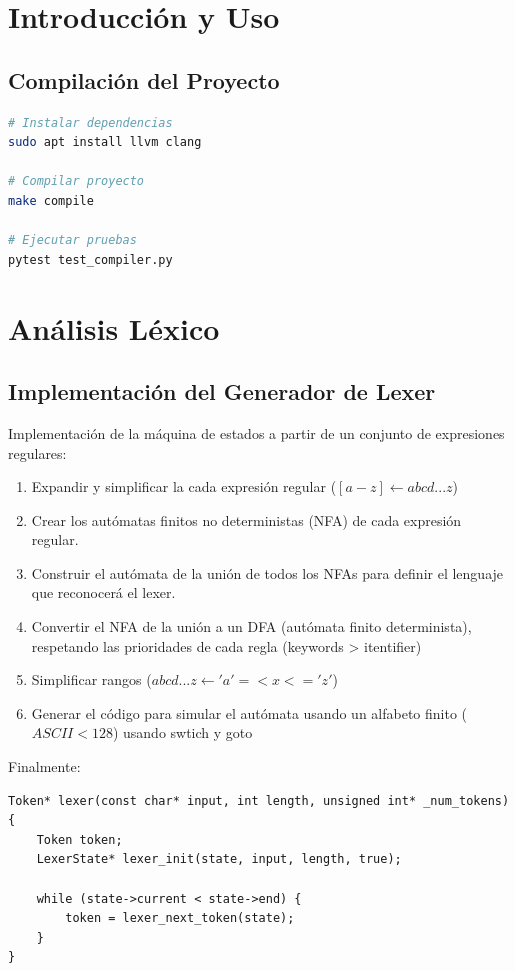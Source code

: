 \documentclass[11pt]{article}
\begin{document}
\section{Introducción y Uso}
\subsection{Compilación del Proyecto}
\begin{lstlisting}[language=bash]
# Instalar dependencias
sudo apt install llvm clang

# Compilar proyecto
make compile

# Ejecutar pruebas
pytest test_compiler.py
\end{lstlisting}

\section{Análisis Léxico}
\subsection{Implementación del Generador de Lexer}
Implementación de la máquina de estados a partir de un conjunto de expresiones regulares:

\begin{enumerate}
    \item Expandir y simplificar la cada expresión regular ($[a-z] \leftarrow abcd...z$)
    \item Crear los autómatas finitos no deterministas (NFA) de cada expresión regular.
    \item Construir el autómata de la unión de todos los NFAs para definir el lenguaje que reconocerá el lexer.
    \item Convertir el NFA de la unión a un DFA (autómata finito determinista), respetando las prioridades de cada regla (keywords > itentifier)
    \item Simplificar rangos ($abcd...z \leftarrow 'a' =< x <= 'z'$)
    \item Generar el código para simular el autómata usando un alfabeto finito ($ASCII < 128$) usando swtich y goto
\end{enumerate}


Finalmente:

\begin{lstlisting}
Token* lexer(const char* input, int length, unsigned int* _num_tokens) {
    Token token;
    LexerState* lexer_init(state, input, length, true);

    while (state->current < state->end) {
        token = lexer_next_token(state);
    }
}
\end{lstlisting}
\end{document}
